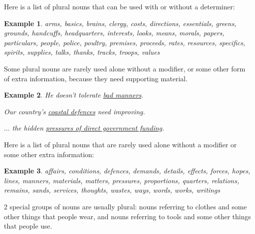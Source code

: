 \documentclass[oneside]{book}
\numberwithin{equation}{section}
\newtheorem{example}{Example}[section]
\begin{document}
Here is a list of plural nouns that can be used with or without a determiner:
\begin{example}
    arms, basics, brains, clergy, costs, directions, essentials, greens, grounds, handcuffs, headquarters, interests, looks, means, morals, papers, particulars, people, police, poultry, premises, proceeds, rates, resources, specifics, spirits, supplies, talks, thanks, tracks, troops, values
\end{example}
%
\noindent{} Some plural nouns are rarely used alone without a modifier, or some other form of extra information, because they need supporting material.
\begin{example}
    He doesn't tolerate \underline{bad manners}.
    
    Our country's \underline{coastal defences} need improving.
    
    $\ldots$ the hidden \underline{pressures of direct government funding}.
\end{example}
Here is a list of plural nouns that are rarely used alone without a modifier or some other extra information:
\begin{example}
    affairs, conditions, defences, demands, details, effects, forces, hopes, lines, manners, materials, matters, pressures, proportions, quarters, relations, remains, sands, services, thoughts, wastes, ways, words, works, writings
\end{example}
%
\noindent{} 2 special groups of nouns are usually plural: nouns referring to clothes and some other things that people wear, and nouns referring to tools and some other things that people use.
\end{document}
